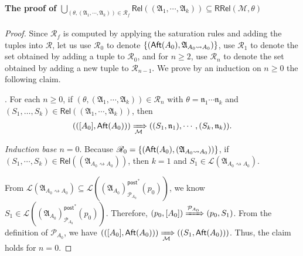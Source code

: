 \documentclass[preprint,12pt]{elsarticle}
\newtheorem{lemma}[theorem]{Lemma}
\newcommand\Mm{{\mathcal{M} }}
\newcommand\Pp{{\mathcal{P} }}
\newcommand\aft{{\sf Aft}}
\newcommand\conf{{\mathsf{Conf} }}
\newcommand\post{{\mathsf{post} }}
\newcommand\aname{\mathfrak{n}}
\newcommand\AutReach{\mathscr{R}}
\newcommand\RRel{\mathsf{RRel}}
\newcommand\Rel{\mathsf{Rel}}
\newcommand\Aut{{\mathfrak{A} }}
\newcommand\Lang{{\mathscr{L} }}
\newcommand\ConfSet{{\mathscr{C} }}
\begin{document}
\paragraph*{The proof of $\bigcup \limits_{(\theta, (\Aut_1, \cdots, \Aut_k)) \in \AutReach_f}  \Rel((\Aut_1, \cdots, \Aut_k)) \subseteq \RRel(\Mm, \theta)$}


\begin{proof}
Since $\AutReach_f$ is computed by applying the saturation rules and adding the tuples into $\AutReach$,  let us use $\AutReach_0$ to denote $\{(\aft(A_0), \Aut_{A_0\rightsquigarrow A_0})\}$, use $\AutReach_1$ to denote the set obtained by adding a tuple to $\AutReach_0$, and for $n \ge 2$, use $\AutReach_n$ to denote the set obtained by adding a new tuple to $\AutReach_{n-1}$. 
We prove by an induction on $n \ge 0$ the following claim.  

\smallskip
{}. For each $n \ge 0$, if $(\theta, (\Aut_1, \cdots, \Aut_k)) \in \AutReach_n$ with $\theta = \aname_1 \cdots \aname_k$ and $(S_1,\dots,S_k) \in \Rel((\Aut_1, \cdots, \Aut_k))$, then $$(([A_0], \aft(A_0))) \xRightarrow[\Mm]{} ((S_1, \aname_1), \cdots, (S_k, \aname_k)).$$

\smallskip



\noindent \emph{Induction base $n = 0$}. 
Because $\AutReach_0 = \{(\aft(A_0),(\Aut_{A_0\rightsquigarrow A_0}))\}$, if $(S_1, \cdots, S_k) \in \Rel((\Aut_{A_0\rightsquigarrow A_0}))$, then $k=1$ and $S_1 \in\Lang(\Aut_{A_0\rightsquigarrow A_0})$. 

From $\Lang(\Aut_{A_0\rightsquigarrow A_0}) \subseteq \Lang((\Aut_{A_0})^{\post^*}_{\Pp_{A_0}}(p_0))$, we know $S_1\in \Lang((\Aut_{A_0})^{\post^*}_{\Pp_{A_0}}(p_0))$. Therefore, $(p_0,[A_0])\xRightarrow{\Pp_{A_0}}(p_0,S_1)$. From the definition of $\Pp_{A_0}$, we have $(([A_0], \aft(A_0))) \xRightarrow[\Mm]{} ((S_1, \aft(A_0)))$. Thus, the claim holds for $n = 0$. 


\end{proof}
\end{document}
